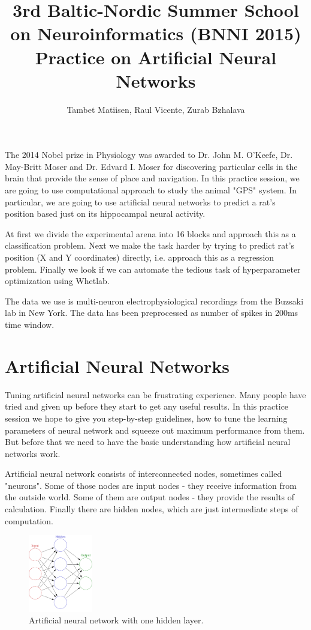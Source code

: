\documentclass[a4paper,11pt]{article}
\author{\large{Tambet Matiisen, Raul Vicente, Zurab Bzhalava}}
\title{\huge{3rd Baltic-Nordic Summer School on Neuroinformatics (BNNI 2015)}\\\LARGE{Practice on Artificial Neural Networks}}
\begin{document}
\maketitle

%
%
The 2014 Nobel prize in Physiology was awarded to Dr. John M. O'Keefe, Dr. May-Britt Moser and Dr. Edvard I. Moser for discovering particular cells in the brain that provide the sense of place and navigation. In this practice session, we are going to use computational approach to study the animal "GPS" system. In particular, we are going to use artificial neural networks to predict a rat's position based just on its hippocampal neural activity.

At first we divide the experimental arena into 16 blocks and approach this as a classification problem. Next we make the task harder by trying to predict rat's position (X and Y coordinates) directly, i.e. approach this as a regression problem. Finally we look if we can automate the tedious task of hyperparameter optimization using Whetlab. 

The data we use is multi-neuron electrophysiological recordings from the Buzsaki lab in New York. The data has been preprocessed as number of spikes in 200ms time window.

%
%
\section{Artificial Neural Networks}

Tuning artificial neural networks can be frustrating experience. Many people have tried and given up before they start to get any useful results. In this practice session we hope to give you step-by-step guidelines, how to tune the learning parameters of neural network and squeeze out  maximum performance from them. But before that we need to have the basic understanding how artificial neural networks work.

Artificial neural network consists of interconnected nodes, sometimes called "neurons". Some of those nodes are input nodes - they receive information from the outside world. Some of them are output nodes - they provide the results of calculation. Finally there are hidden nodes, which are just intermediate steps of computation.

\begin{figure}[h]
	\centering
	\includegraphics[width=0.25\textwidth]{ann.png}
	\caption{Artificial neural network with one hidden layer.}
\end{figure}
\end{document}
